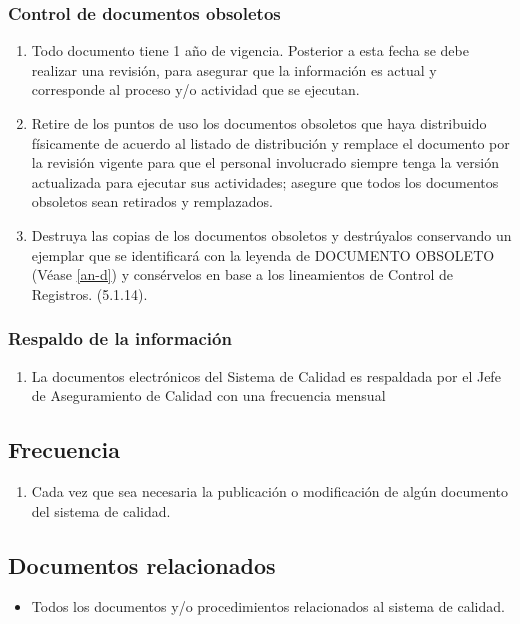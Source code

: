 \subsubsection{Control de documentos obsoletos}
\begin{enumerate}
\item Todo documento tiene  1 año de vigencia. Posterior a esta fecha se debe realizar una revisión, para asegurar que la información es actual y corresponde al proceso y/o actividad que se ejecutan.
\item Retire de los puntos de uso los documentos obsoletos que haya distribuido físicamente de acuerdo al listado de distribución y remplace el documento por la revisión vigente para que el personal involucrado siempre tenga la versión actualizada para ejecutar sus actividades; asegure que todos los documentos obsoletos sean retirados y remplazados.
\item Destruya las copias de los documentos obsoletos y destrúyalos conservando un ejemplar que se identificará con la leyenda de DOCUMENTO OBSOLETO (Véase \cref{an-d}) y consérvelos en base a los lineamientos de Control de Registros. (5.1.14).
\end{enumerate}

\subsubsection{Respaldo de la información}
\begin{enumerate}
    \item La documentos electrónicos del Sistema de Calidad es respaldada por el Jefe de Aseguramiento de Calidad con una frecuencia mensual
\end{enumerate}

\subsection{Frecuencia}
\begin{enumerate}
\item Cada vez que sea necesaria la publicación o modificación de algún documento del sistema de calidad.
\end{enumerate}

\subsection{Documentos relacionados}
\begin{itemize}
    \item Todos los documentos y/o procedimientos relacionados al sistema de calidad.
\end{itemize}

